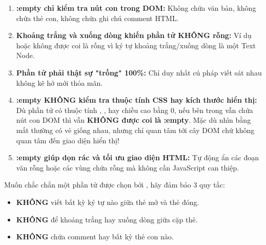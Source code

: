 \begin{warnBox}
\begin{enumerate}[leftmargin=1.5em, itemsep=4pt, parsep=0pt]
    \item \textbf{:empty chỉ kiểm tra nút con trong DOM:} Không chứa văn bản, không chứa thẻ con, không chứa ghi chú comment HTML.
    \item \textbf{Khoảng trắng và xuống dòng khiến phần tử KHÔNG rỗng:} Ví dụ  hoặc  không được coi là rỗng vì ký tự khoảng trắng/xuống dòng là một Text Node.
    \item \textbf{Phần tử phải thật sự "trống" 100\%:} Chỉ duy nhất cú pháp viết sát nhau không kẽ hở  mới thỏa mãn.
    \item \textbf{:empty KHÔNG kiểm tra thuộc tính CSS hay kích thước hiển thị:} Dù phần tử có thuộc tính , , hay chiều cao bằng 0, nếu bên trong vẫn chứa nút con DOM thì vẫn \textbf{KHÔNG được coi là :empty}. Mặc dù nhìn bằng mắt thường có vẻ giống nhau, nhưng  chỉ quan tâm tới cây DOM chứ không quan tâm đến giao diện hiển thị!
    \item \textbf{:empty giúp dọn rác và tối ưu giao diện HTML:} Tự động ẩn các đoạn văn rỗng hoặc các vùng chứa rỗng mà không cần JavaScript can thiệp.
\end{enumerate}
\end{warnBox}

\begin{tipBox}
Muốn chắc chắn một phần tử được chọn bởi , hãy đảm bảo 3 quy tắc:
\begin{itemize}[leftmargin=1.5em, itemsep=2pt, parsep=0pt]
    \item \textbf{KHÔNG} viết bất kỳ ký tự nào giữa thẻ mở và thẻ đóng.
    \item \textbf{KHÔNG} để khoảng trắng hay xuống dòng giữa cặp thẻ.
    \item \textbf{KHÔNG} chứa comment hay bất kỳ thẻ con nào.
\end{itemize}
\end{tipBox}


